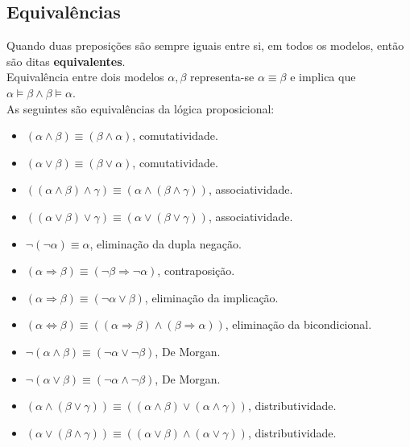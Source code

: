 \documentclass[]{report}
\begin{document}
\subsection{Equivalências}
Quando duas preposições são sempre iguais entre si, em todos os modelos, então são ditas \textbf{equivalentes}.\\
Equivalência entre dois modelos $\alpha, \beta$ representa-se $\alpha \equiv \beta$ e implica que $\alpha \models \beta \wedge \beta \models \alpha$.\\
As seguintes são equivalências da lógica proposicional:
\begin{itemize}
\item $(\alpha \wedge \beta) \equiv (\beta \wedge \alpha)$, comutatividade.
\item $(\alpha \vee \beta) \equiv (\beta \vee \alpha)$, comutatividade.
\item $((\alpha \wedge \beta) \wedge \gamma) \equiv (\alpha \wedge (\beta \wedge \gamma))$, associatividade.
\item $((\alpha \vee \beta) \vee \gamma) \equiv (\alpha \vee (\beta \vee \gamma))$, associatividade.
\item $\neg(\neg \alpha) \equiv \alpha$, eliminação da dupla negação.
\item $(\alpha \Rightarrow \beta) \equiv (\neg \beta \Rightarrow \neg \alpha)$, contraposição.
\item $(\alpha \Rightarrow \beta) \equiv (\neg \alpha \vee \beta)$, eliminação da implicação.
\item $(\alpha \Leftrightarrow \beta) \equiv ((\alpha \Rightarrow \beta) \wedge (\beta \Rightarrow \alpha))$, eliminação da bicondicional.
\item $\neg(\alpha \wedge \beta) \equiv (\neg \alpha \vee \neg \beta)$, De Morgan.
\item $\neg(\alpha \vee \beta) \equiv (\neg \alpha \wedge \neg \beta)$, De Morgan.
\item $(\alpha \wedge (\beta \vee \gamma)) \equiv ((\alpha \wedge \beta) \vee (\alpha \wedge \gamma))$, distributividade.
\item $(\alpha \vee (\beta \wedge \gamma)) \equiv ((\alpha \vee \beta) \wedge (\alpha \vee \gamma))$, distributividade.
\end{itemize}
\end{document}
